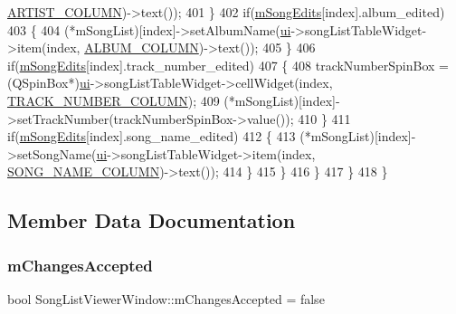 \begin{DoxyCode}
      \mbox{\hyperlink{songlistviewerwindow_8h_a4df933f03e6d62e433d019b597e25109}{ARTIST\_COLUMN}})->text());
401                 \}
402                 \textcolor{keywordflow}{if}(\mbox{\hyperlink{class_song_list_viewer_window_aa38d8a91dc7ebe0925602b3846c34fdc}{mSongEdits}}[index].album\_edited)
403                 \{
404                     (*mSongList)[index]->setAlbumName(\mbox{\hyperlink{class_song_list_viewer_window_ac24fa09133b92a7b4cbd757f9b84258d}{ui}}->songListTableWidget->item(index, 
      \mbox{\hyperlink{songlistviewerwindow_8h_a36e2a49e6de166851f1039129ea2a9fb}{ALBUM\_COLUMN}})->text());
405                 \}
406                 \textcolor{keywordflow}{if}(\mbox{\hyperlink{class_song_list_viewer_window_aa38d8a91dc7ebe0925602b3846c34fdc}{mSongEdits}}[index].track\_number\_edited)
407                 \{
408                     trackNumberSpinBox = (QSpinBox*)\mbox{\hyperlink{class_song_list_viewer_window_ac24fa09133b92a7b4cbd757f9b84258d}{ui}}->songListTableWidget->cellWidget(index, 
      \mbox{\hyperlink{songlistviewerwindow_8h_ab082e8ecd5faa2301f1d67d8df3b0eee}{TRACK\_NUMBER\_COLUMN}});
409                     (*mSongList)[index]->setTrackNumber(trackNumberSpinBox->value());
410                 \}
411                 \textcolor{keywordflow}{if}(\mbox{\hyperlink{class_song_list_viewer_window_aa38d8a91dc7ebe0925602b3846c34fdc}{mSongEdits}}[index].song\_name\_edited)
412                 \{
413                     (*mSongList)[index]->setSongName(\mbox{\hyperlink{class_song_list_viewer_window_ac24fa09133b92a7b4cbd757f9b84258d}{ui}}->songListTableWidget->item(index, 
      \mbox{\hyperlink{songlistviewerwindow_8h_a7376276fcf9a1862cfadc5ab562d3672}{SONG\_NAME\_COLUMN}})->text());
414                 \}
415             \}
416         \}
417     \}
418 \}
\end{DoxyCode}


\subsection{Member Data Documentation}
\mbox{\label{class_song_list_viewer_window_aa8fcb59a0ed81ec14c6ac611e1812c08}} 
\subsubsection{\texorpdfstring{m\+Changes\+Accepted}{mChangesAccepted}}
{\footnotesize\ttfamily bool Song\+List\+Viewer\+Window\+::m\+Changes\+Accepted = false\hspace{0.3cm}{\ttfamily [private]}}



